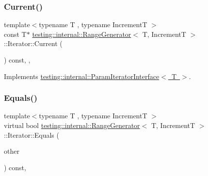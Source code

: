\mbox{\label{classtesting_1_1internal_1_1_range_generator_1_1_iterator_acbdfc5919d37fb9514914afb041e50ff}} 
\subsubsection{\texorpdfstring{Current()}{Current()}\hspace{0.1cm}{\footnotesize\ttfamily [3/3]}}
{\footnotesize\ttfamily template$<$typename T , typename IncrementT $>$ \\
const T$\ast$ \mbox{\hyperlink{classtesting_1_1internal_1_1_range_generator}{testing\+::internal\+::\+Range\+Generator}}$<$ T, IncrementT $>$\+::Iterator\+::\+Current (\begin{DoxyParamCaption}{ }\end{DoxyParamCaption}) const\hspace{0.3cm}{\ttfamily [inline]}, {\ttfamily [override]}, {\ttfamily [virtual]}}



Implements \mbox{\hyperlink{classtesting_1_1internal_1_1_param_iterator_interface_adfff808576d929085679c315b255af7e}{testing\+::internal\+::\+Param\+Iterator\+Interface$<$ T $>$}}.

\mbox{\label{classtesting_1_1internal_1_1_range_generator_1_1_iterator_a2ae0f453be98bdcfffecc3c71c7a9879}} 
\subsubsection{\texorpdfstring{Equals()}{Equals()}\hspace{0.1cm}{\footnotesize\ttfamily [1/3]}}
{\footnotesize\ttfamily template$<$typename T , typename IncrementT $>$ \\
virtual bool \mbox{\hyperlink{classtesting_1_1internal_1_1_range_generator}{testing\+::internal\+::\+Range\+Generator}}$<$ T, IncrementT $>$\+::Iterator\+::\+Equals (\begin{DoxyParamCaption}\item[{const \mbox{\hyperlink{classtesting_1_1internal_1_1_param_iterator_interface}{Param\+Iterator\+Interface}}$<$ T $>$ \&}]{other }\end{DoxyParamCaption}) const\hspace{0.3cm}{\ttfamily [inline]}, {\ttfamily [virtual]}}



